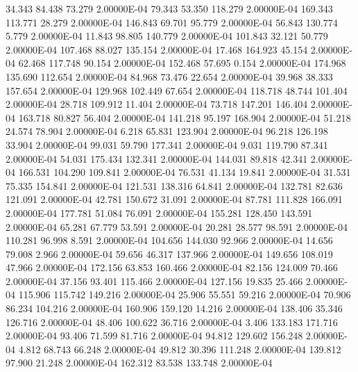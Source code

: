     34.343    84.438    73.279  2.00000E-04
    79.343    53.350   118.279  2.00000E-04
   169.343   113.771    28.279  2.00000E-04
   146.843    69.701    95.779  2.00000E-04
    56.843   130.774     5.779  2.00000E-04
    11.843    98.805   140.779  2.00000E-04
   101.843    32.121    50.779  2.00000E-04
   107.468    88.027   135.154  2.00000E-04
    17.468   164.923    45.154  2.00000E-04
    62.468   117.748    90.154  2.00000E-04
   152.468    57.695     0.154  2.00000E-04
   174.968   135.690   112.654  2.00000E-04
    84.968    73.476    22.654  2.00000E-04
    39.968    38.333   157.654  2.00000E-04
   129.968   102.449    67.654  2.00000E-04
   118.718    48.744   101.404  2.00000E-04
    28.718   109.912    11.404  2.00000E-04
    73.718   147.201   146.404  2.00000E-04
   163.718    80.827    56.404  2.00000E-04
   141.218    95.197   168.904  2.00000E-04
    51.218    24.574    78.904  2.00000E-04
     6.218    65.831   123.904  2.00000E-04
    96.218   126.198    33.904  2.00000E-04
    99.031    59.790   177.341  2.00000E-04
     9.031   119.790    87.341  2.00000E-04
    54.031   175.434   132.341  2.00000E-04
   144.031    89.818    42.341  2.00000E-04
   166.531   104.290   109.841  2.00000E-04
    76.531    41.134    19.841  2.00000E-04
    31.531    75.335   154.841  2.00000E-04
   121.531   138.316    64.841  2.00000E-04
   132.781    82.636   121.091  2.00000E-04
    42.781   150.672    31.091  2.00000E-04
    87.781   111.828   166.091  2.00000E-04
   177.781    51.084    76.091  2.00000E-04
   155.281   128.450   143.591  2.00000E-04
    65.281    67.779    53.591  2.00000E-04
    20.281    28.577    98.591  2.00000E-04
   110.281    96.998     8.591  2.00000E-04
   104.656   144.030    92.966  2.00000E-04
    14.656    79.008     2.966  2.00000E-04
    59.656    46.317   137.966  2.00000E-04
   149.656   108.019    47.966  2.00000E-04
   172.156    63.853   160.466  2.00000E-04
    82.156   124.009    70.466  2.00000E-04
    37.156    93.401   115.466  2.00000E-04
   127.156    19.835    25.466  2.00000E-04
   115.906   115.742   149.216  2.00000E-04
    25.906    55.551    59.216  2.00000E-04
    70.906    86.234   104.216  2.00000E-04
   160.906   159.120    14.216  2.00000E-04
   138.406    35.346   126.716  2.00000E-04
    48.406   100.622    36.716  2.00000E-04
     3.406   133.183   171.716  2.00000E-04
    93.406    71.599    81.716  2.00000E-04
    94.812   129.602   156.248  2.00000E-04
     4.812    68.743    66.248  2.00000E-04
    49.812    30.396   111.248  2.00000E-04
   139.812    97.900    21.248  2.00000E-04
   162.312    83.538   133.748  2.00000E-04
